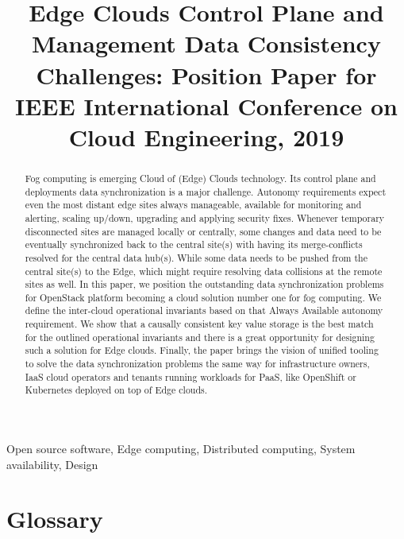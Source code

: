\documentclass[conference]{IEEEtran}
\begin{document}
\title{Edge Clouds Control Plane and Management Data Consistency
Challenges: Position Paper for IEEE International Conference on Cloud
Engineering, 2019\\ }

\author{
}

\maketitle

\begin{abstract}
Fog computing is emerging Cloud of (Edge) Clouds technology. Its control plane
and deployments data synchronization is a major challenge. Autonomy requirements
expect even the most distant edge sites always manageable, available for
monitoring and alerting, scaling up/down, upgrading and applying security fixes.
Whenever temporary disconnected sites are managed locally or centrally, some
changes and data need to be eventually synchronized back to the central site(s)
with having its merge-conflicts resolved for the central data hub(s). While
some data needs to be pushed from the central site(s) to the Edge, which might
require resolving data collisions at the remote sites as well. In this paper,
we position the outstanding data synchronization problems for OpenStack
platform becoming a cloud solution number one for fog computing. We define the
inter-cloud operational invariants based on that Always Available autonomy
requirement. We show that a causally consistent key value storage is the best
match for the outlined operational invariants and there is a great opportunity
for designing such a solution for Edge clouds. Finally, the paper brings the
vision of unified tooling to solve the data synchronization problems the same
way for infrastructure owners, IaaS cloud operators and tenants running
workloads for PaaS, like OpenShift or Kubernetes deployed on top of Edge
clouds.
\end{abstract}

\begin{IEEEkeywords}
Open source software, Edge computing, Distributed computing, System
availability, Design
\end{IEEEkeywords}


\section{Glossary}
\end{document}
